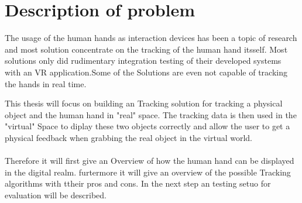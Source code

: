 \chapter{Description of problem}

The usage of the human hands as interaction devices has been a topic of research and most solution concentrate on the tracking of the human hand itsself. Most solutions only did rudimentary integration testing of their developed systems with an VR application.Some of the Solutions are even not capable of tracking the hands in real time.

This thesis will focus on building an Tracking solution for tracking  a physical object and the human hand in "real" space. The tracking data is then used in the "virtual" Space to diplay these two objects correctly and allow the user to get a physical feedback when grabbing the real object in the virtual world.\\
\\
Therefore it will first give an Overview of how the human hand can be displayed in the digital realm. furtermore it will give an overview of the possible Tracking algorithms with ttheir pros and cons.
In the next step an testing setuo for evaluation will be described.




